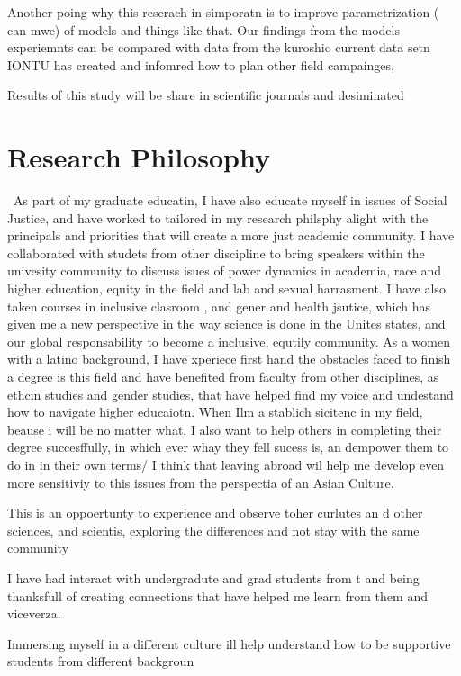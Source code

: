 \documentclass[letterpaper, 12pt ]{article}
\begin{document}
Another poing why this reserach in simporatn is to improve parametrization ( can mwe) of models and things like that. Our findings from the models experiemnts can be compared with data from the kuroshio current data setn IONTU has created and infomred how to plan other field campainges, 

Results of this study will be share in scientific journals and desiminated 

\section*{Research Philosophy}

\ As part of  my graduate educatin, I have also educate myself in issues of Social Justice, and have worked to tailored in my research philsphy alight with the principals and priorities that will create a more just academic community. I have collaborated with studets from other discipline to bring speakers within the univesity community to discuss isues of power dynamics in academia, race and higher education, equity in the field and lab and sexual harrasment. I have also taken courses in inclusive clasroom , and gener and health jsutice, which has given me a new perspective in the way science is done in the Unites states, and our global responsability to become a inclusive, equtily community. As a women with a latino background, I have xperiece first hand the obstacles faced to finish a degree is this field and have benefited from faculty from other disciplines, as ethcin studies and gender studies, that have helped find my voice and undestand how to navigate higher educaiotn. When Ilm a stablich sicitenc in my field, beause i will be no matter what, I also want to help others in completing their degree succesffully, in which ever whay they fell sucess is, an dempower them to do in in their own terms/ 
 I think that leaving abroad wil help me develop even more sensitiviy to this issues from the perspectia of an Asian Culture. 

This is an oppoertunty to experience and observe toher curlutes an d other sciences, and scientis, exploring the differences and not stay with the same community


I have had interact with undergradute and grad students from t and being thanksfull of creating connections that have helped me learn from them and viceverza. 

Immersing myself in a different culture ill help understand how to be supportive students from different backgroun
\end{document}
